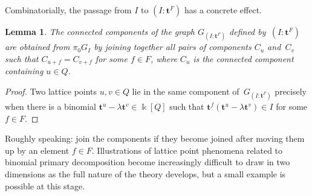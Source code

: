 \documentclass[12pt]{amsart}
\numberwithin{equation}{section}
\newtheorem{lemma}[thm]{Lemma}
\theoremstyle{definition}
\begin{document}
Combinatorially, the passage from $I$ to $(I:{\mathbf{t}}^F)$ has a concrete
effect.

\begin{lemma}\label{l:colon}
The connected components of the graph $G_{(I:{\mathbf{t}}^F)}$ defined
by~$(I:{\mathbf{t}}^F)$ are obtained from $\pi_0 G_I$ by joining together all
pairs of components $C_u$ and~$C_v$ such that $C_{u+f} = C_{v+f}$ for
some $f \in F$, where $C_u$ is the connected component containing $u
\in Q$.
\end{lemma}
\begin{proof}
Two lattice points $u,v \in Q$ lie in the same component
of~$G_{(I:{\mathbf{t}}^F)}$ precisely when there is a binomial ${\mathbf{t}}^u -
\lambda{\mathbf{t}}^v \in {\Bbbk}[Q]$ such that ${\mathbf{t}}^f({\mathbf{t}}^u - \lambda{\mathbf{t}}^v)
\in I$ for some $f \in F$.
\end{proof}

Roughly speaking: join the components if they become joined after
moving them up by an element $f \in F$.  Illustrations of lattice
point phenomena related to binomial primary decomposition become
increasingly difficult to draw in two dimensions as the full nature of
the theory develops, but a small example is possible at this stage.
\end{document}
